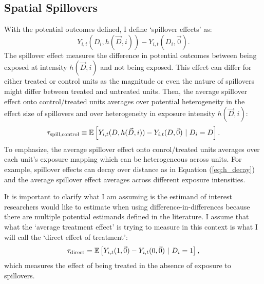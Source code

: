\documentclass[11pt]{article}
\begin{document}



\subsection{Spatial Spillovers}

With the potential outcomes defined, I define `spillover effects' as: \[
    Y_{i,t}(D_i, h(\vec{D}, i)) - Y_{i,t}(D_i, \vec{0}).
\] 
The spillover effect measures the difference in potential outcomes between being exposed at intensity $h(\vec{D}, i)$ and not being exposed. This effect can differ for either treated or control units as the magnitude or even the nature of spillovers might differ between treated and untreated units. Then, the average spillover effect onto control/treated units averages over potential heterogeneity in the effect size of spillovers and over heterogeneity in exposure intensity $h(\vec{D}, i)$: \[
    \tau_{\text{spill,control}} \equiv \mathbb{E}\left[Y_{i,t}(D, h(\vec{D}, i)) - Y_{i,t}(D, \vec{0}) \ \vert \ D_i = D\right].
\]
To emphasize, the average spillover effect onto conrol/treated units averages over each unit's exposure mapping which can be heterogeneous across units. For example, spillover effects can decay over distance as in Equation (\ref{eq:h_decay}) and the average spillover effect averages across different exposure intensities. 

It is important to clarify what I am assuming is the estimand of interest researchers would like to estimate when using difference-in-differences because there are multiple potential estimands defined in the literature. I assume that what the `average treatment effect' is trying to measure in this context is what I will call the `direct effect of treatment': \[
    \tau_{\text{direct}} = \mathbb{E}\left[Y_{i,t}(1, \vec{0}) - Y_{i,t}(0, \vec{0}) \ \vert \ D_i = 1\right],
\] 
which measures the effect of being treated in the absence of exposure to spillovers. 
\end{document}

